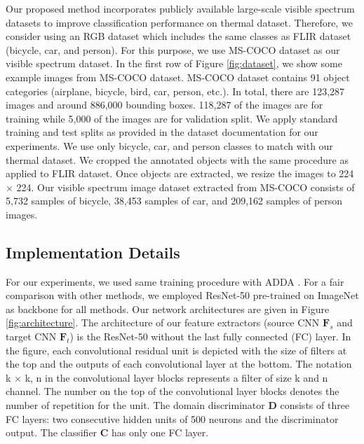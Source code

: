 \documentclass[final]{cvpr}
\begin{document}
Our proposed method incorporates publicly available large-scale visible spectrum datasets to improve classification performance on thermal dataset. Therefore, we consider using an RGB dataset which includes the same classes as FLIR dataset \cite{flir} (bicycle, car, and person). For this purpose, we use MS-COCO dataset \cite{mscoco} as our visible spectrum dataset. In the first row of Figure \ref{fig:dataset}, we show some example images from MS-COCO dataset. MS-COCO dataset contains 91 object categories (airplane, bicycle, bird, car, person, etc.). In total, there are 123,287 images and around 886,000 bounding boxes. 118,287 of the images are for training while 5,000 of the images are for validation split. We apply standard training and test splits as provided in the dataset documentation for our experiments. We use only bicycle, car, and person classes to match with our thermal dataset. We cropped the annotated objects with the same procedure as applied to FLIR dataset. Once objects are extracted, we resize the images to 224 $ \times $ 224. Our visible spectrum image dataset extracted from MS-COCO consists of 5,732 samples of bicycle, 38,453 samples of car, and 209,162 samples of person images.

\subsection{Implementation Details}
\label{sec:implementation}

For our experiments, we used same training procedure with ADDA \cite{adda}. For a fair comparison with other methods, we employed ResNet-50 \cite{resnet} pre-trained on ImageNet \cite{imagenet_cvpr09} as backbone for all methods. Our network architectures are given in Figure \ref{fig:architecture}. The architecture of our feature extractors (source CNN $ \mathbf{F}_s $ and target CNN $ \mathbf{F}_t $) is the ResNet-50 without the last fully connected (FC) layer. In the figure, each convolutional residual unit is depicted with the size of filters at the top and the outputs of each convolutional layer at the bottom. The notation k $ \times $ k, n in the convolutional layer blocks represents a filter of size k and n channel. The number on the top of the convolutional layer blocks denotes the number of repetition for the unit. The domain discriminator $ \mathbf{D} $ consists of three FC layers: two consecutive hidden units of 500 neurons and the discriminator output. The classifier $ \mathbf{C} $ has only one FC layer.
\vspace{2mm}
\end{document}
